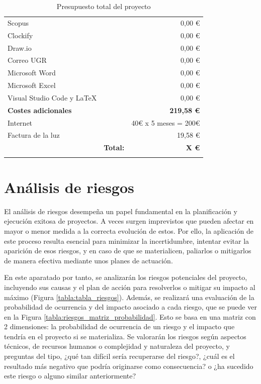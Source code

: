 \begin{longtable}[c]{lm{2cm}r}
Scopus                                  && 0,00 €             \\
Clockify                                && 0,00 €             \\
Draw.io                                 && 0,00 €             \\
Correo UGR                              && 0,00 €             \\
Microsoft Word                          && 0,00 €             \\
Microsoft Excel                         && 0,00 €             \\
Visual Studio Code y LaTeX              && 0,00 €             \\
\midrule
\textbf{Costes adicionales}             && \textbf{219,58 €}  \\
Internet                                && 40€ x 5 meses = 200€           \\
Factura de la luz                       && 19,58 €            \\
\midrule
  &   \multicolumn{1}{r}{\textbf{Total:}} & \textbf{X €} \\
\bottomrule
\caption{Presupuesto total del proyecto}
\label{tabla:presupuesto_total}
\end{longtable}


\section{Análisis de riesgos} \label{riesgos}
El análisis de riesgos desempeña un papel fundamental en la planificación y ejecución exitosa de proyectos. A veces surgen imprevistos que pueden afectar en mayor o menor medida a la correcta evolución de estos. Por ello, la aplicación de este proceso resulta esencial para minimizar la incertidumbre, intentar evitar la aparición de esos riesgos, y en caso de que se materialicen, paliarlos o mitigarlos de manera efectiva mediante unos planes de actuación.

En este aparatado por tanto, se analizarán los riesgos potenciales del proyecto, incluyendo sus causas y el plan de acción para resolverlos o mitigar su impacto al máximo (Figura \ref{tabla:tabla_riesgos}). Además, se realizará una evaluación de la probabilidad de ocurrencia y del impacto asociado a cada riesgo, que se puede ver en la Figura \ref{tabla:riesgos_matriz_probabilidad}. Esto se basa en una matriz con 2 dimensiones: la probabilidad de ocurrencia de un riesgo y el impacto que tendría en el proyecto si se materializa. Se valorarán los riesgos según aspectos técnicos, de recursos humanos o complejidad y naturaleza del proyecto, y preguntas del tipo, ¿qué tan difícil sería recuperarse del riesgo?, ¿cuál es el resultado más negativo que podría originarse como consecuencia? o ¿ha sucedido este riesgo o alguno similar anteriormente?


